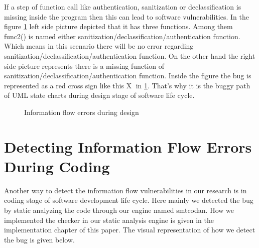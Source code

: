 If a step of function call like authentication, sanitization or declassification is missing inside the program then this can lead to software vulnerabilities. In the figure \ref{figure_FunctionCallMissing} left side picture depicted that it has three functions. Among them func2() is named either sanitization/declassification/authentication function. Which means in this scenario there will be no error regarding sanitization/declassification/authentication function. On the other hand the right side picture represents there is a missing function of sanitization/declassification/authentication function. Inside the figure the bug is represented as a red cross sign like this \textcircled{X} in \ref{figure_FunctionCallMissing}. That's why it is the buggy path of UML state charts during design stage of software life cycle. 
\begin{figure}[htbp]
	\centering
	\caption{Information flow errors during design}
	\label{figure_FunctionCallMissing}
\end{figure}


\section{ Detecting Information Flow Errors During Coding}

Another way to detect the information flow vulnerabilities in our research is in coding stage of software development life cycle. Here mainly we detected the bug by static analyzing the code through our engine named smtcodan. How we implemented the checker in our static analysis engine is given in the implementation chapter of this paper. The visual representation of how we detect the bug is given below.

